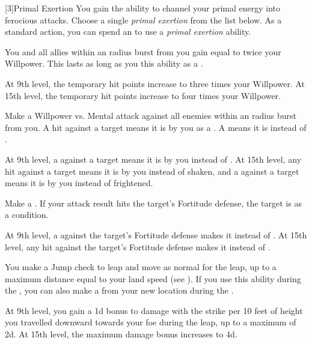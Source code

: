             [3]{Primal Exertion}
            You gain the ability to channel your primal energy into ferocious attacks.
            Choose a single \textit{primal exertion} from the list below.
            As a standard action, you can spend an  to use a \textit{primal exertion} ability.
            {
                 You and all allies within an \arealarge radius burst from you gain  equal to twice your Willpower.
                This lasts as long as you  this ability as a .

                At 9th level, the temporary hit points increase to three times your Willpower.
                At 15th level, the temporary hit points increase to four times your Willpower.

                Make a Willpower vs. Mental attack against all enemies within an \arealarge radius burst from you.
                A hit against a target means it is \shaken by you as a .
                A  means it is \frightened instead of \shaken.

                At 9th level, a  against a target means it is \frightened by you instead of \shaken.
                At 15th level, any hit against a target means it is \frightened by you instead of shaken, and a  against a target means it is \panicked by you instead of frightened.

                 Make a .
                If your attack result hits the target's Fortitude defense, the target is \sickened as a condition.

                At 9th level, a  against the target's Fortitude defense makes it \nauseated instead of \sickened.
                At 15th level, any hit against the target's Fortitude defense makes it \nauseated instead of \sickened.

                 You make a Jump check to leap and move as normal for the leap, up to a maximum distance equal to your land speed (see ).
                If you use this ability during the , you can also make a  from your new location during the .

                At 9th level, you gain a \plus1d bonus to damage with the strike per 10 feet of height you travelled downward towards your foe during the leap, up to a maximum of \plus2d.
                At 15th level, the maximum damage bonus increases to \plus4d.

}
